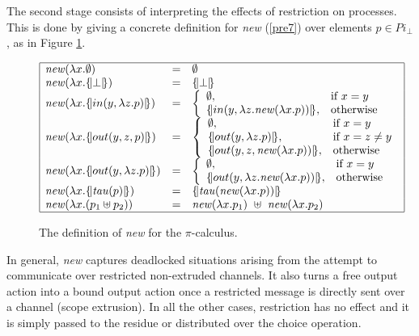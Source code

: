\documentclass[10pt,a4paper,final,oneside,fleqn]{book}
\begin{document}
The second stage consists of interpreting the effects of restriction on processes.  This is done by giving a concrete definition for {\itshape new\/} (\ref{pre7}) over elements $p\in Pi_\bot$, as in Figure \ref{newpi}.
\begin{figure}[bht]
\begin{center}
$\begin{array}{|lll|}\hline
\mbox{{\itshape new\/}}(\lambda x.\emptyset)&=&\emptyset\\
\mbox{{\itshape new\/}}(\lambda x.\{\!|\bot|\!\})&=&\{\!|\bot|\!\}\\
\mbox{{\itshape new\/}}(\lambda x.\{\!|in(y,\lambda z.p)|\!\})&=&
\left\{\begin{array}{ll}
\emptyset,&\mbox{if }x=y\\
\{\!|in(y,\lambda z.\mbox{{\itshape new\/}}(\lambda x.p))|\!\},&\mbox{otherwise}\\
\end{array}\right.\\
\mbox{{\itshape new\/}}(\lambda x.\{\!|out(y,z,p)|\!\})&=&
\left\{\begin{array}{ll}
\emptyset,&\mbox{if }x=y\\
\{\!|out(y,\lambda z.p)|\!\},&\mbox{if }x=z\neq y\\
\{\!|out(y,z,\mbox{{\itshape new\/}}(\lambda x.p))|\!\},&\mbox{otherwise}
\end{array}\right.\\
\mbox{{\itshape new\/}}(\lambda x.\{\!|out(y,\lambda z.p)|\!\})&=&
\left\{\begin{array}{ll}
\emptyset,&\mbox{if }x=y\\
\{\!|out(y,\lambda z.\mbox{{\itshape new\/}}(\lambda x.p))|\!\},&\mbox{otherwise}\\
\end{array}\right.\\
\mbox{{\itshape new\/}}(\lambda x.\{\!|\mbox{{\itshape tau\/}}(p)|\!\})&=&\{\!|\mbox{{\itshape tau\/}}(\mbox{{\itshape new\/}}(\lambda x.p))|\!\}\\
\mbox{{\itshape new\/}}(\lambda x.(p_1\uplus p_2))&=&\mbox{{\itshape new\/}}(\lambda x.p_1)~\uplus~\mbox{{\itshape new\/}}(\lambda x.p_2)\\
\hline
\end{array}$
\end{center}
\caption{The definition of {\itshape new\/} for the $\pi$-calculus.\label{newpi}}
\end{figure}


In general, {\itshape new\/} captures deadlocked situations arising from the attempt to communicate over restricted non-extruded channels.  It also turns a free output action into a bound output action once a restricted message is directly sent over a channel (scope extrusion).  In all the other cases, restriction has no effect and it is simply passed to the residue or distributed over the choice operation.
\end{document}
